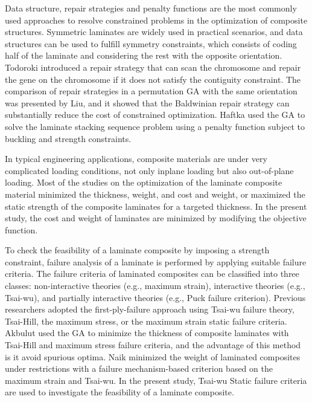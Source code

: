 \documentclass[USenglish,twocolumn]{article}
\begin{document}
Data structure, repair strategies and penalty functions\cite{le1995improved} are the most commonly used
approaches to resolve constrained problems in the optimization of composite structures. Symmetric
laminates are widely used in practical scenarios, and data structures can be used to fulfill symmetry
constraints, which consists of coding half of the laminate and considering the rest with the
opposite orientation. Todoroki\cite{todoroki1998stacking} introduced a repair strategy that can scan the chromosome and
repair the gene on the chromosome if it does not satisfy the contiguity constraint. The comparison of
repair strategies in a permutation GA with the same orientation was presented by Liu\cite{liu2000permutation}, and it
showed that the Baldwinian repair strategy can substantially reduce the cost of constrained optimization.
Haftka\cite{riche1993optimization} used the GA to solve the laminate stacking sequence problem using a penalty function subject to
buckling and strength constraints.

In typical engineering applications, composite materials are under very complicated loading
conditions, not only inplane loading but also out-of-plane loading. Most of the studies on the
optimization of the laminate composite material minimized the
thickness\cite{abu1998optimum,walker2003technique},
weight\cite{fang1993design,deka2005multiobjective,park2008improved}, and cost and
weight\cite{deka2005multiobjective,omkar2008artificial}, or maximized the static strength of
the composite laminates for a targeted
thickness\cite{walker2003technique,lin2004stacking,kim2007development}. %
In the present study,
the cost and weight of laminates are minimized by modifying the objective function.

To check the feasibility of a laminate composite by imposing a strength constraint, failure
analysis of a laminate is performed by applying suitable failure criteria. The failure criteria of
laminated composites can be classified into three classes: non-interactive theories (e.g., maximum
strain), interactive theories (e.g., Tsai-wu), and partially interactive theories (e.g., Puck failure
criterion). Previous researchers adopted the first-ply-failure approach using Tsai-wu
failure
theory\cite{massard1984computer,reddy1987first,fang1993design,soeiro1994multilevel,pelletier2006multi,jadhav2007parametric,omkar2008artificial,choudhury2019failure},
Tsai-Hill\cite{martin1987optimum,soares1995discrete}, the maximum stress\cite{watkins1987multicriteria}, or the maximum strain\cite{watkins1987multicriteria}
static failure criteria. Akbulut\cite{akbulut2008optimum} used the GA to minimize the thickness of composite laminates with
Tsai-Hill and maximum stress failure criteria, and the advantage of this method is it avoid spurious
optima. Naik\cite{naik2008design}
minimized the weight of laminated composites under restrictions with a
failure mechanism-based criterion based on the maximum strain and Tsai-wu. In the present study, Tsai-wu
Static failure criteria are used to investigate the feasibility of a laminate composite.
\end{document}
